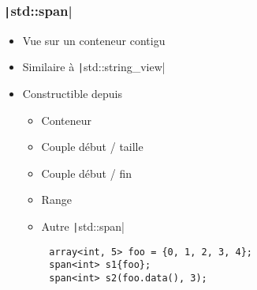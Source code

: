 \documentclass[C++.tex]{subfiles}
\begin{document}
\begin{frame}[fragile]
	\frametitle{\texttt|std::span|}
	\begin{itemize}
		\item Vue sur un conteneur contigu
		\item Similaire à \texttt|std::string_view|
		\item Constructible depuis 
		\begin{itemize}
			\item Conteneur
			\item Couple début / taille
			\item Couple début / fin
			\item Range
			\item Autre \texttt|std::span|
		\end{itemize}
	\end{itemize}

	\begin{verbatim}
		array<int, 5> foo = {0, 1, 2, 3, 4};
		span<int> s1{foo};
		span<int> s2(foo.data(), 3);
	\end{verbatim}
\end{frame}
\end{document}
